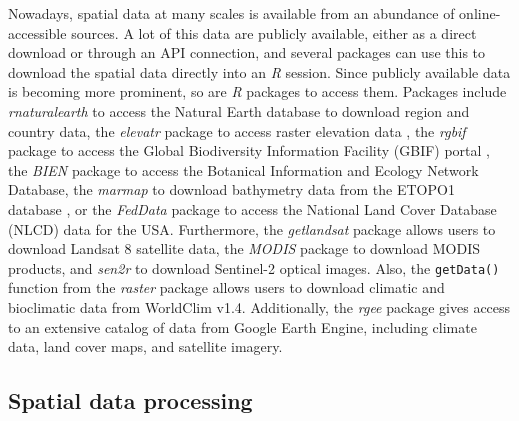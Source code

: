\documentclass[smallextended]{svjour3}       %
\begin{document}
Nowadays, spatial data at many scales is available from an abundance of online-accessible sources.
A lot of this data are publicly available, either as a direct download or through an API connection, and several packages can use this to download the spatial data directly into an \textit{R} session.
Since publicly available data is becoming more prominent, so are \textit{R} packages to access them.
Packages include \textit{rnaturalearth} \cite{South2017} to access the Natural Earth database to download region and country data, the \textit{elevatr} package to access raster elevation data \cite{Hollister2020}, the \textit{rgbif} package to access the Global Biodiversity Information Facility (GBIF) portal \cite{Chamberlain2017}, the \textit{BIEN} package \cite{Maitner2020} to access the Botanical Information and Ecology Network Database, the \textit{marmap} to download bathymetry data from the ETOPO1 database \cite{Pante2013}, or the \textit{FedData} package \cite{Bocinsky2019} to access the National Land Cover Database (NLCD) data for the USA.
Furthermore, the \textit{getlandsat} package \cite{Chamberlain2018} allows users to download Landsat 8 satellite data, the \textit{MODIS} package \cite{Mattiuzzi2020} to download MODIS products, and \textit{sen2r} \cite{Ranghetti2020} to download Sentinel-2 optical images.
Also, the \texttt{getData()} function from the \textit{raster} package allows users to download climatic and bioclimatic data from WorldClim v1.4.
Additionally, the \textit{rgee} package \cite{Aybar2020} gives access to an extensive catalog of data from Google Earth Engine, including climate data, land cover maps, and satellite imagery.

\hypertarget{spatial-data-processing}{%
\subsection{Spatial data processing}\label{spatial-data-processing}}
\end{document}
